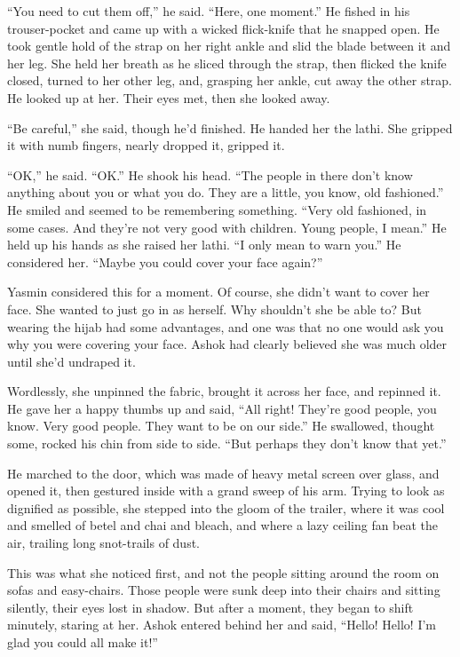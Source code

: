 ``You need to cut them off,'' he said. ``Here, one moment.'' He fished
in his trouser-pocket and came up with a wicked flick-knife that he
snapped open. He took gentle hold of the strap on her right ankle
and slid the blade between it and her leg. She held her breath as
he sliced through the strap, then flicked the knife closed, turned
to her other leg, and, grasping her ankle, cut away the other
strap. He looked up at her. Their eyes met, then she looked away.

``Be careful,'' she said, though he'd finished. He handed her the
lathi. She gripped it with numb fingers, nearly dropped it, gripped
it.

``OK,'' he said. ``OK.'' He shook his head. ``The people in there don't
know anything about you or what you do. They are a little, you
know, old fashioned.'' He smiled and seemed to be remembering
something. ``Very old fashioned, in some cases. And they're not very
good with children. Young people, I mean.'' He held up his hands as
she raised her lathi. ``I only mean to warn you.'' He considered her.
``Maybe you could cover your face again?''

Yasmin considered this for a moment. Of course, she didn't want to
cover her face. She wanted to just go in as herself. Why shouldn't
she be able to? But wearing the hijab had some advantages, and one
was that no one would ask you why you were covering your face.
Ashok had clearly believed she was much older until she'd undraped
it.

Wordlessly, she unpinned the fabric, brought it across her face,
and repinned it. He gave her a happy thumbs up and said, ``All
right! They're good people, you know. Very good people. They want
to be on our side.'' He swallowed, thought some, rocked his chin
from side to side. ``But perhaps they don't know that yet.''

He marched to the door, which was made of heavy metal screen over
glass, and opened it, then gestured inside with a grand sweep of
his arm. Trying to look as dignified as possible, she stepped into
the gloom of the trailer, where it was cool and smelled of betel
and chai and bleach, and where a lazy ceiling fan beat the air,
trailing long snot-trails of dust.

This was what she noticed first, and not the people sitting around
the room on sofas and easy-chairs. Those people were sunk deep into
their chairs and sitting silently, their eyes lost in shadow. But
after a moment, they began to shift minutely, staring at her. Ashok
entered behind her and said, ``Hello! Hello! I'm glad you could all
make it!''

